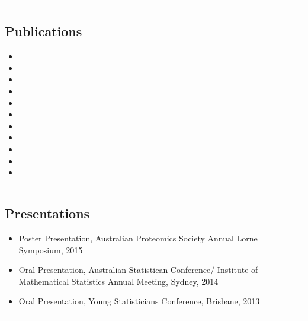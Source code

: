 \documentclass[a4paper,12pt]{report}
\begin{document}
\hrule

\subsection*{Publications}          

\begin{itemize}
	\item {}
	\item {}
	\item {}
	\item {}
	\item {}
	\item {}
	\item {}
	\item {}
	\item {}
	\item {}
	\item {}
\end{itemize}


\hrule


\subsection*{Presentations}          

\begin{itemize}
	\item Poster Presentation, Australian Proteomics Society Annual Lorne Symposium, 2015
	\item Oral Presentation, Australian Statistican Conference/ Institute of Mathematical Statistics Annual Meeting, Sydney, 2014
	\item Oral Presentation, Young Statisticians Conference, Brisbane, 2013
\end{itemize}


\hrule
\end{document}
